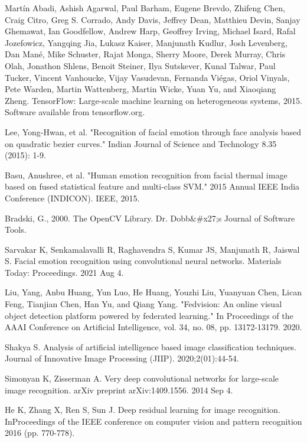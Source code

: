 \documentclass[letterpaper,10pt]{article}
\begin{document}
\begin{thebibliography}{00}
 Martín Abadi, Ashish Agarwal, Paul Barham, Eugene Brevdo, Zhifeng Chen, Craig Citro, Greg S. Corrado, Andy Davis, Jeffrey Dean, Matthieu Devin, Sanjay Ghemawat, Ian Goodfellow, Andrew Harp, Geoffrey Irving, Michael Isard, Rafal Jozefowicz, Yangqing Jia, Lukasz Kaiser, Manjunath Kudlur, Josh Levenberg, Dan Mané, Mike Schuster, Rajat Monga, Sherry Moore, Derek Murray, Chris Olah, Jonathon Shlens, Benoit Steiner, Ilya Sutskever, Kunal Talwar, Paul Tucker, Vincent Vanhoucke, Vijay Vasudevan, Fernanda Viégas, Oriol Vinyals, Pete Warden, Martin Wattenberg, Martin Wicke, Yuan Yu, and Xiaoqiang Zheng. TensorFlow: Large-scale machine learning on heterogeneous systems, 2015. Software available from tensorflow.org.

 Lee, Yong-Hwan, et al. "Recognition of facial emotion through face analysis based on quadratic bezier curves." Indian Journal of Science and Technology 8.35 (2015): 1-9.

 Basu, Anushree, et al. "Human emotion recognition from facial thermal image based on fused statistical feature and multi-class SVM." 2015 Annual IEEE India Conference (INDICON). IEEE, 2015.

 Bradski, G., 2000. The OpenCV Library. Dr. Dobb\&\#x27;s Journal of Software Tools.

 Sarvakar K, Senkamalavalli R, Raghavendra S, Kumar JS, Manjunath R, Jaiswal S. Facial emotion recognition using convolutional neural networks. Materials Today: Proceedings. 2021 Aug 4.

 Liu, Yang, Anbu Huang, Yun Luo, He Huang, Youzhi Liu, Yuanyuan Chen, Lican Feng, Tianjian Chen, Han Yu, and Qiang Yang. "Fedvision: An online visual object detection platform powered by federated learning." In Proceedings of the AAAI Conference on Artificial Intelligence, vol. 34, no. 08, pp. 13172-13179. 2020.

 Shakya S. Analysis of artificial intelligence based image classification techniques. Journal of Innovative Image Processing (JIIP). 2020;2(01):44-54.

 Simonyan K, Zisserman A. Very deep convolutional networks for large-scale image recognition. arXiv preprint arXiv:1409.1556. 2014 Sep 4.

 He K, Zhang X, Ren S, Sun J. Deep residual learning for image recognition. InProceedings of the IEEE conference on computer vision and pattern recognition 2016 (pp. 770-778).


\end{thebibliography}
\end{document}
